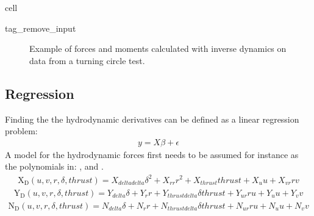 \documentclass[review]{elsarticle}
\begin{document}
\begin{sphinxuseclass}{cell}
\begin{sphinxuseclass}{tag_remove_input}
\end{sphinxuseclass}
\end{sphinxuseclass}
\begin{figure}[htbp]
\centering
\capstart

\noindent{}
\caption{Example of forces and moments calculated with inverse dynamics on data from a turning circle test.}\label{\detokenize{03.01_inverse_dynamics:fig-inverse}}\end{figure}


\subsection{Regression}
\label{\detokenize{03.01_inverse_dynamics:regression}}
\sphinxAtStartPar
Finding the the hydrodynamic derivatives can be defined as a linear regression problem:
\begin{equation}\label{equation:03.01_inverse_dynamics:eqregression}
\begin{split}y = X\beta + \epsilon\end{split}
\end{equation}
\sphinxAtStartPar
A model for the hydrodynamic forces first needs to be assumed for instance as the polynomials in: {\hyperref[\detokenize{03.01_inverse_dynamics:equation-eqxqsmodel}]{}}, {\hyperref[\detokenize{03.01_inverse_dynamics:equation-eqyqsmodel}]{}} and {\hyperref[\detokenize{03.01_inverse_dynamics:equation-eqnqsmodel}]{}}.
\begin{equation}\label{equation:03.01_inverse_dynamics:eqxqsmodel}
\begin{split}\displaystyle \operatorname{X_{D}}{\left(u,v,r,\delta,thrust \right)} = X_{deltadelta} \delta^{2} + X_{rr} r^{2} + X_{thrust} thrust + X_{u} u + X_{vr} r v\end{split}
\end{equation}\begin{equation}\label{equation:03.01_inverse_dynamics:eqyqsmodel}
\begin{split}\displaystyle \operatorname{Y_{D}}{\left(u,v,r,\delta,thrust \right)} = Y_{delta} \delta + Y_{r} r + Y_{thrustdelta} \delta thrust + Y_{ur} r u + Y_{u} u + Y_{v} v\end{split}
\end{equation}\begin{equation}\label{equation:03.01_inverse_dynamics:eqnqsmodel}
\begin{split}\displaystyle \operatorname{N_{D}}{\left(u,v,r,\delta,thrust \right)} = N_{delta} \delta + N_{r} r + N_{thrustdelta} \delta thrust + N_{ur} r u + N_{u} u + N_{v} v\end{split}
\end{equation}
\end{document}

